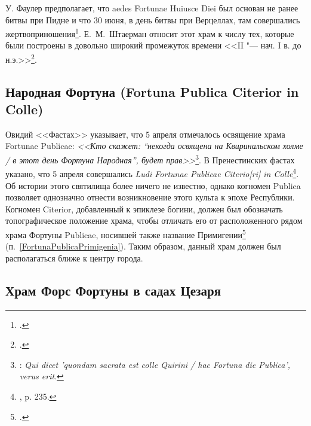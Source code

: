 У. Фаулер предполагает, что aedes Fortunae Huiusce Diei был основан не ранее битвы при Пидне и что 30 июня, в день битвы при Верцеллах, там совершались жертвоприношения\footcite[P. 165]{Fowler1899}.  Е.~М.~Штаерман относит этот храм к числу тех, которые были построены в довольно широкий промежуток времени <<II "--- нач. I в. до н.э.>>\footcite[С. 112]{Shtaerman1987}.

\subsection{Народная Фортуна (Fortuna Publica Citerior in Colle)}\label{FortunaPublicaCiteriori}

Овидий <<Фастах>> указывает, что 5 апреля отмечалось освящение храма Fortunae Publicae: \textit{<<Кто скажет: ``некогда освящена на Квиринальском холме / в этот день Фортуна Народная'', будет прав>>}\footnote{: \textit{Qui dicet 'quondam sacrata est colle Quirini / hac Fortuna die Publica', verus erit}.}. В Пренестинских фастах указано, что 5 апреля совершались \textit{Ludi Fortunae Publicae Citerio[ri] in Colle}\footnote{, p. 235.}. Об истории этого святилища более ничего не известно, однако когномен Publica позволяет однозначно отнести возникновение этого культа к эпохе Республики. Когномен Citerior, добавленный к эпиклезе богини, должен был обозначать топографическое положение храма, чтобы отличать его от расположенного рядом храма Фортуны Publicae, носившей также название Примигении\footcite[P. 9]{Champeaux1987} (п.~\ref{FortunaPublicaPrimigenia}). Таким образом, данный храм должен был располагаться ближе к центру города.

\subsection{Храм Форс Фортуны в садах Цезаря}\label{FortisFortunae3}

